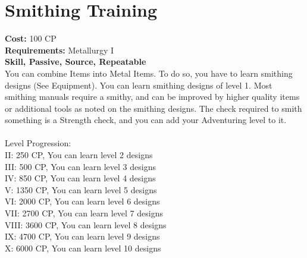 \section{Smithing Training}
\textbf{Cost:} 100 CP\\
\textbf{Requirements:} Metallurgy I\\
\textbf{Skill, Passive, Source, Repeatable}\\
You can combine Items into Metal Items. To do so, you have to learn smithing designs (See Equipment). You can learn smithing designs of level 1. Most smithing manuals require a smithy, and can be improved by higher quality items or additional tools as noted on the smithing designs. The check required to smith something is a Strength check, and you can add your Adventuring level to it.\\
\\
Level Progression:\\
II: 250 CP, You can learn level 2 designs\\
III: 500 CP, You can learn level 3 designs\\
IV: 850 CP, You can learn level 4 designs\\
V: 1350 CP, You can learn level 5 designs\\
VI: 2000 CP, You can learn level 6 designs\\
VII: 2700 CP, You can learn level 7 designs\\
VIII: 3600 CP, You can learn level 8 designs\\
IX: 4700 CP, You can learn level 9 designs\\
X: 6000 CP, You can learn level 10 designs\\